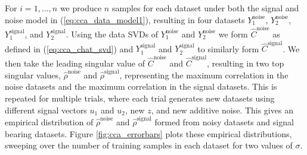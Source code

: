 For $i=1,\dots,n$ we produce $n$ samples for each dataset under both the signal and noise
model in (\ref{eq:cca_data_model1}), resulting in four datasets $Y_1^{\text{noise}}$,
$Y_2^{\text{noise}}$, $Y_1^{\text{signal}}$, and $Y_2^{\text{signal}}$. Using the data
SVDs of $Y_1^{\text{noise}}$ and $Y_2^{\text{noise}}$ we form $\widehat{C}^{\text{noise}}$
as defined in (\ref{eq:cca_chat_svd}) and $Y_1^{\text{signal}}$ and $Y_2^{\text{signal}}$
to similarly form $\widehat{C}^{\text{signal}}$. We then take the leading singular value
of $\widehat{C}^{\text{noise}}$ and $\widehat{C}^{\text{signal}}$, resulting in two top
singular values, $\widehat{\rho}^{\text{noise}}$ and $\widehat{\rho}^{\text{signal}}$,
representing the maximum correlation in the noise datasets and the maximum correlation in
the signal datasets. This is repeated for multiple trials, where each trial generates new
datasets using different signal vectors $u_1$ and $u_2$, new $z$, and new additive
noise. This gives an empirical distribution of $\widehat{\rho}^{\text{noise}}$ and
$\widehat{\rho}^{\text{signal}}$ formed from noisy datasets and signal bearing
datasets. Figure \ref{fig:cca_errorbars} plots these empirical distributions, sweeping
over the number of training samples in each dataset for two values of $\sigma$.

